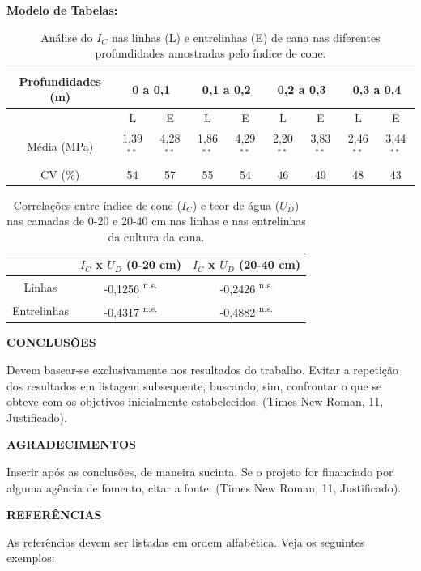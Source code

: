\documentclass[article,11pt]{abntex2}
\renewcommand{\section}[1]{\par\bigskip\noindent\MakeUppercase{\textbf{#1}}\par}
\begin{document}
\textbf{Modelo de Tabelas:}
	\begin{table}[h]
	    \centering
	    \caption{Análise do $I_C$ nas linhas (L) e entrelinhas (E) de cana nas diferentes profundidades amostradas pelo índice de cone.}\label{tab:Tab1}
	    \begin{tabular}{*{9}{c}}\hline
	       Profundidades (m)  & \multicolumn{2}{c}{0 a 0,1} & \multicolumn{2}{c}{0,1 a 0,2} & \multicolumn{2}{c}{0,2 a 0,3} & \multicolumn{2}{c}{0,3 a 0,4} \\\hline
	         & L & E & L & E & L & E & L & E\\
	       Média (MPa) & 1,39$^{**}$ & 4,28$^{**}$ & 1,86$^{**}$ & 4,29$^{**}$ & 2,20$^{**}$ & 3,83$^{**}$ & 2,46$^{**}$ & 3,44$^{**}$ \\
	       CV (\%) & 54 & 57 & 55 & 54 & 46 & 49 & 48 & 43 \\\hline
	    \end{tabular}
	\end{table}
	
    \begin{table}[h]
        \centering
        \caption{Correlações entre índice de cone ($I_C$) e teor de água ($U_D$) nas camadas de 0-20 e 20-40 cm nas linhas e nas entrelinhas da cultura da cana.}\label{tab:Tab2}
        \begin{tabular}{c c c}\hline
             & $I_C$ x $U_D$ (0-20 cm) & $I_C$ x $U_D$ (20-40 cm)\\\hline
           Linhas  & -0,1256 \textsuperscript{n.s.} & -0,2426  \textsuperscript{n.s.} \\
           Entrelinhas  & -0,4317  \textsuperscript{n.s.} & -0,4882  \textsuperscript{n.s.} \\\hline
        \end{tabular}
    \end{table}
	
	\section{Conclusões}
	Devem basear-se exclusivamente nos resultados do trabalho. Evitar a repetição dos resultados em listagem subsequente, buscando, sim, confrontar o que se obteve com os objetivos inicialmente estabelecidos. (Times New Roman, 11, Justificado).
	
	\section{Agradecimentos}
	Inserir após as conclusões, de maneira sucinta. Se o projeto for financiado por alguma agência de fomento, citar a fonte. (Times New Roman, 11, Justificado).

	
	\section{Referências}
	As referências devem ser listadas em ordem alfabética. Veja os seguintes exemplos:
	\nocite{*}
	
	
	
\end{document}
